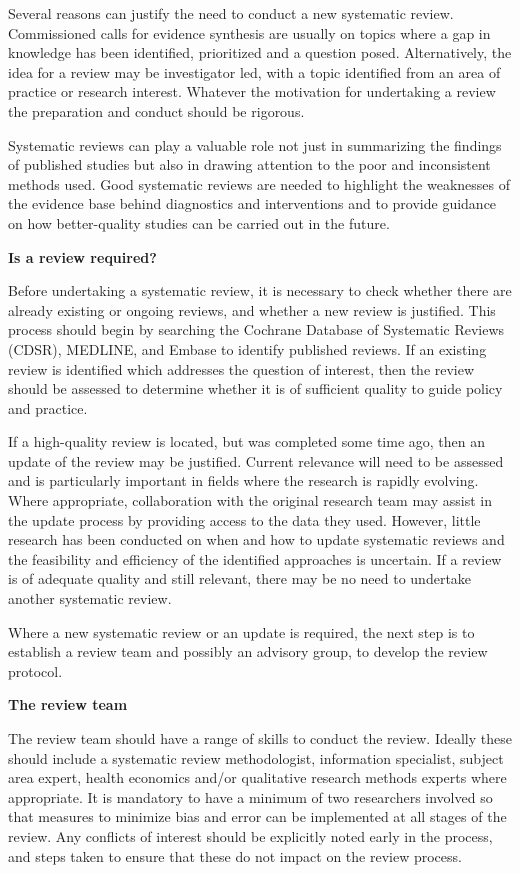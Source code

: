 \documentclass[
  10pt,
  a4paper,
  DIV=11,
  numbers=noendperiod]{scrreprt}
\begin{document}
Several reasons can justify the need to conduct a new systematic review.
Commissioned calls for evidence synthesis are usually on topics where a
gap in knowledge has been identified, prioritized and a question posed.
Alternatively, the idea for a review may be investigator led, with a
topic identified from an area of practice or research interest. Whatever
the motivation for undertaking a review the preparation and conduct
should be rigorous.

Systematic reviews can play a valuable role not just in summarizing the
findings of published studies but also in drawing attention to the poor
and inconsistent methods used. Good systematic reviews are needed to
highlight the weaknesses of the evidence base behind diagnostics and
interventions and to provide guidance on how better-quality studies can
be carried out in the future.

\textbf{Is a review required?}

Before undertaking a systematic review, it is necessary to check whether
there are already existing or ongoing reviews, and whether a new review
is justified. This process should begin by searching the Cochrane
Database of Systematic Reviews (CDSR), MEDLINE, and Embase to identify
published reviews. If an existing review is identified which addresses
the question of interest, then the review should be assessed to
determine whether it is of sufficient quality to guide policy and
practice.

If a high-quality review is located, but was completed some time ago,
then an update of the review may be justified. Current relevance will
need to be assessed and is particularly important in fields where the
research is rapidly evolving. Where appropriate, collaboration with the
original research team may assist in the update process by providing
access to the data they used. However, little research has been
conducted on when and how to update systematic reviews and the
feasibility and efficiency of the identified approaches is uncertain. If
a review is of adequate quality and still relevant, there may be no need
to undertake another systematic review.

Where a new systematic review or an update is required, the next step is
to establish a review team and possibly an advisory group, to develop
the review protocol.

\textbf{The review team}

The review team should have a range of skills to conduct the review.
Ideally these should include a systematic review methodologist,
information specialist, subject area expert, health economics and/or
qualitative research methods experts where appropriate. It is mandatory
to have a minimum of two researchers involved so that measures to
minimize bias and error can be implemented at all stages of the review.
Any conflicts of interest should be explicitly noted early in the
process, and steps taken to ensure that these do not impact on the
review process.
\end{document}
